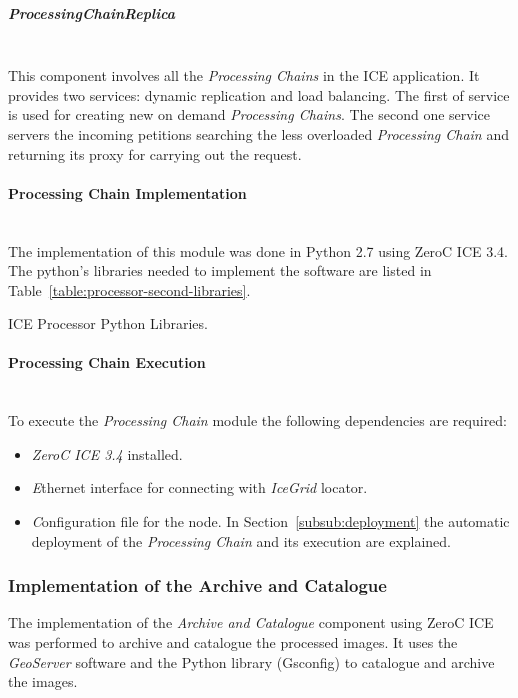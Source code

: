 \subparagraph{ProcessingChainReplica}~\\

This component involves all the \emph{Processing Chains} in the ICE application. It
provides two services: dynamic replication and load balancing. The first
of service is used for creating new on demand \emph{Processing Chains}. The second
one service servers the incoming petitions searching the less overloaded \emph{Processing Chain}
and returning its proxy for carrying out the request.

\paragraph{Processing Chain Implementation}~\\

The implementation of this module was done in Python 2.7 using ZeroC ICE 3.4. The
python's libraries needed to implement the software are listed in
Table~\ref{table:processor-second-libraries}.

\begin{table}[hp]
  \centering
  {\small
  
  }
  \caption{ICE Processor Python Libraries.}
  \label{table:processor-second-libraries}
\end{table}

\paragraph{Processing Chain Execution}~\\

To execute the \emph{Processing Chain} module the following dependencies
are required:
\begin{itemize}
\item \emph{ZeroC ICE 3.4} installed.
\item \emph Ethernet interface for connecting with \emph{IceGrid} locator.
\item \emph Configuration file for the node. In Section~\ref{subsub:deployment} the
  automatic deployment of the \emph{Processing Chain} and its execution are explained. 
\end{itemize}

\subsubsection{Implementation of the Archive and Catalogue}

The implementation of the \emph{Archive and Catalogue} component using
ZeroC ICE was
performed to archive and catalogue the processed images. It uses the
\emph{GeoServer} software and the Python library (Gsconfig) to catalogue and
archive the images.


